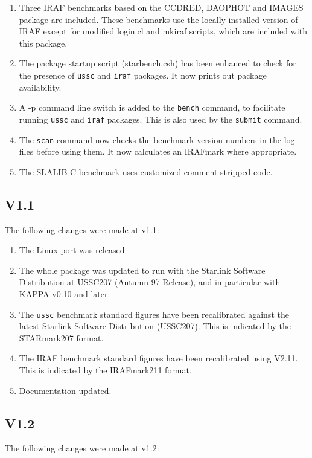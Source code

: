 \begin{enumerate}
\item Three IRAF benchmarks based on the CCDRED, DAOPHOT and IMAGES package
are included. These benchmarks use the locally installed version of IRAF
except for modified login.cl and mkiraf scripts, which are included with
this package.
\item The package startup script (starbench.csh) has been enhanced to check
for the presence of {\tt ussc} and {\tt iraf} packages. It now prints out
package availability.
\item A -p command line switch is added to the {\tt bench} command, to
facilitate running {\tt ussc} and {\tt iraf} packages. This is also used
by the {\tt submit} command.
\item The {\tt scan} command now checks the benchmark version numbers in the
log files before using them. It now calculates an IRAFmark where appropriate.
\item The SLALIB C benchmark uses customized comment-stripped code.
\end{enumerate} 

\subsection{V1.1}

The following changes were made at v1.1:

\begin{enumerate}
\item The Linux port was released
\item The whole package was updated to run with the Starlink Software
Distribution at USSC207 (Autumn 97 Release), and in particular with KAPPA
v0.10 and later.
\item The {\tt ussc} benchmark standard figures have been recalibrated 
against the latest Starlink Software Distribution (USSC207). This is 
indicated by the STARmark207 format.
\item The IRAF benchmark standard figures have been recalibrated using V2.11.
This is indicated by the IRAFmark211 format.
\item Documentation updated.
\end{enumerate}

\subsection{V1.2}

The following changes were made at v1.2:

